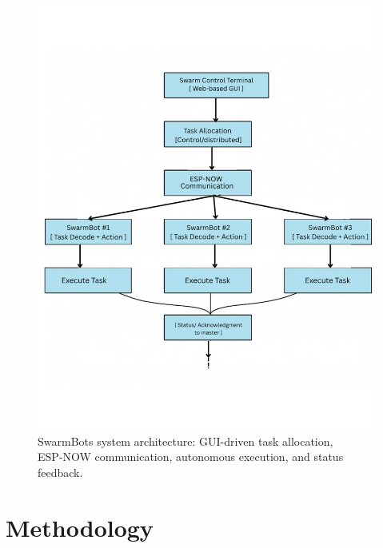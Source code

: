 \documentclass[conference]{IEEEtran}
\begin{document}
\begin{enumerate}
\begin{figure}[t]
    \centering
    \includegraphics[width=\columnwidth]{figs/Swarm Block.png}
\caption{SwarmBots system architecture: GUI-driven task allocation, ESP‑NOW communication, autonomous execution, and status feedback.}


  \label{fig:system-architecture}
\end{figure}
\end{enumerate}
\section{Methodology}
\label{sec:Methodology}
\end{document}
